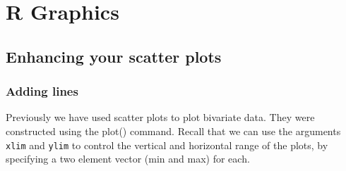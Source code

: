 \chapter{ R Graphics}
\section{Enhancing your scatter plots}
\subsection{Adding lines}
Previously we have used scatter plots to plot bivariate data. They were constructed using the plot() command.
Recall that we can use the arguments \texttt{xlim} and \texttt{ylim} to control the vertical and horizontal range of the plots, by specifying a two element vector (min and max) for each.

